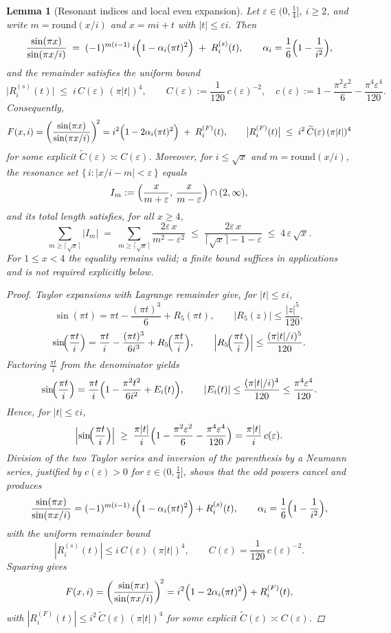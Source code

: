 \documentclass[11pt,a4paper]{amsart}
\theoremstyle{plain}
\newtheorem{lemma}[theorem]{Lemma}
\theoremstyle{definition}
\theoremstyle{remark}
\begin{document}
\medskip
\begin{lemma}[Resonant indices and local even expansion]\label{lem:resonance}
Let $\varepsilon\in(0,\tfrac14]$, $i\ge2$, and write $m=\mathrm{round}(x/i)$ and $x=mi+t$ with $|t|\le \varepsilon i$. Then
\[
\frac{\sin(\pi x)}{\sin(\pi x/i)} \;=\; (-1)^{m(i-1)}\,i\Bigl(1-\alpha_i(\pi t)^2\Bigr)\;+\;R_i^{(s)}(t),
\qquad
\alpha_i=\frac{1}{6}\Bigl(1-\frac{1}{i^{2}}\Bigr),
\]
and the remainder satisfies the uniform bound
\[
\bigl|R_i^{(s)}(t)\bigr|\;\le\; i\,C(\varepsilon)\,(\pi|t|)^4,
\qquad
C(\varepsilon):=\frac{1}{120}\,c(\varepsilon)^{-2},\quad
c(\varepsilon):=1-\frac{\pi^2\varepsilon^2}{6}-\frac{\pi^4\varepsilon^4}{120}.
\]
Consequently,
\[
F(x,i)=\left(\frac{\sin(\pi x)}{\sin(\pi x/i)}\right)^{\!2}
= i^2\Bigl(1-2\alpha_i(\pi t)^2\Bigr)\;+\;R_i^{(F)}(t),
\qquad
\bigl|R_i^{(F)}(t)\bigr|\;\le\; i^2\,\widetilde C(\varepsilon)\,(\pi|t|)^4
\]
for some explicit $\widetilde C(\varepsilon)\asymp C(\varepsilon)$.
Moreover, for $i\le\sqrt{x}$ and $m=\mathrm{round}(x/i)$, the resonance set $\{\,i:|x/i-m|<\varepsilon\,\}$ equals 
\[
I_m:=\Bigl(\frac{x}{m+\varepsilon},\,\frac{x}{m-\varepsilon}\Bigr)\cap (2,\infty),
\]
and its total length satisfies, for all $x\ge 4$,
\[
\sum_{m\ge \lceil \sqrt{x}\rceil}\! |I_m| 
\;=\;\sum_{m\ge \lceil \sqrt{x}\rceil}\frac{2\varepsilon\,x}{m^2-\varepsilon^2}
\;\le\; \frac{2\varepsilon\,x}{\lceil \sqrt{x}\rceil-1-\varepsilon}
\;\le\; 4\,\varepsilon\,\sqrt{x}.
\]
For $1\le x<4$ the equality remains valid; a finite bound suffices in applications and is not required explicitly below.

\begin{proof}
Taylor expansions with Lagrange remainder give, for $|t|\le\varepsilon i$,
\[
\sin(\pi t)=\pi t-\frac{(\pi t)^3}{6}+R_5(\pi t),\qquad |R_5(z)|\le \frac{|z|^5}{120},
\]
\[
\sin\!\Bigl(\frac{\pi t}{i}\Bigr)=\frac{\pi t}{i}-\frac{(\pi t)^3}{6i^3}+R_5\!\Bigl(\frac{\pi t}{i}\Bigr),
\qquad 
\Bigl|R_5\!\Bigl(\frac{\pi t}{i}\Bigr)\Bigr|\le \frac{(\pi |t|/i)^5}{120}.
\]
Factoring $\frac{\pi t}{i}$ from the denominator yields
\[
\sin\!\Bigl(\frac{\pi t}{i}\Bigr)
=\frac{\pi t}{i}\Bigl(1-\frac{\pi^2 t^2}{6i^2}+E_i(t)\Bigr),
\qquad 
|E_i(t)|\le \frac{(\pi |t|/i)^4}{120}\le \frac{\pi^4\varepsilon^4}{120}.
\]
Hence, for $|t|\le \varepsilon i$,
\[
\Bigl|\sin\!\Bigl(\frac{\pi t}{i}\Bigr)\Bigr|
\;\ge\;\frac{\pi |t|}{i}\Bigl(1-\frac{\pi^2\varepsilon^2}{6}-\frac{\pi^4\varepsilon^4}{120}\Bigr)
=\frac{\pi |t|}{i}\,c(\varepsilon).
\]
Division of the two Taylor series and inversion of the parenthesis by a Neumann series, justified by $c(\varepsilon)>0$ for $\varepsilon\in(0,\tfrac14]$, shows that the odd powers cancel and produces
\[
\frac{\sin(\pi x)}{\sin(\pi x/i)}
=(-1)^{m(i-1)}\,i\Bigl(1-\alpha_i(\pi t)^2\Bigr)+R_i^{(s)}(t),
\qquad \alpha_i=\frac{1}{6}\Bigl(1-\frac{1}{i^2}\Bigr),
\]
with the uniform remainder bound
\[
|R_i^{(s)}(t)|\le i\,C(\varepsilon)\,(\pi |t|)^4,
\qquad 
C(\varepsilon)=\frac{1}{120}\,c(\varepsilon)^{-2}.
\]
Squaring gives
\[
F(x,i)=\left(\frac{\sin(\pi x)}{\sin(\pi x/i)}\right)^{\!2}
= i^2\Bigl(1-2\alpha_i(\pi t)^2\Bigr)+R_i^{(F)}(t),
\]
with $|R_i^{(F)}(t)|\le i^2\,\widetilde C(\varepsilon)\,(\pi |t|)^4$ for some explicit $\widetilde C(\varepsilon)\asymp C(\varepsilon)$. 


\end{proof}
\end{lemma}
\end{document}
